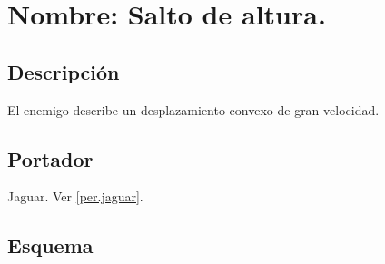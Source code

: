 			\section{Nombre: Salto de altura.} \label{hab.SalAl}
			\subsection{Descripción}
			El enemigo describe un desplazamiento convexo de gran velocidad. 
			\subsection{Portador}
			Jaguar. Ver \ref{per.jaguar}.
			\subsection{Esquema}
			